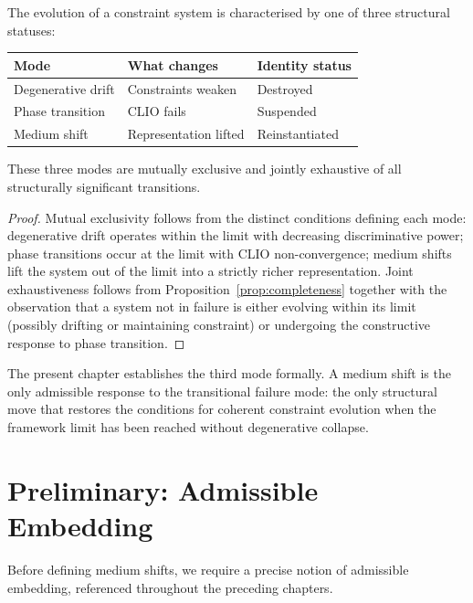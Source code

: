 \documentclass[11pt,openany]{book}
\begin{document}
\begin{proposition}
\label{prop:classification}
The evolution of a constraint system is characterised by
one of three structural statuses:

\medskip
\begin{center}
\begin{tabular}{lll}
\toprule
\textbf{Mode} & \textbf{What changes} & \textbf{Identity status} \\
\midrule
Degenerative drift    & Constraints weaken       & Destroyed       \\
Phase transition      & CLIO fails               & Suspended       \\
Medium shift          & Representation lifted    & Reinstantiated  \\
\bottomrule
\end{tabular}
\end{center}
\medskip

These three modes are mutually exclusive and jointly
exhaustive of all structurally significant transitions.
\end{proposition}

\begin{proof}
Mutual exclusivity follows from the distinct conditions
defining each mode: degenerative drift operates within the
limit with decreasing discriminative power; phase
transitions occur at the limit with CLIO non-convergence;
medium shifts lift the system out of the limit into a
strictly richer representation.  Joint exhaustiveness
follows from Proposition~\ref{prop:completeness} together
with the observation that a system not in failure is either
evolving within its limit (possibly drifting or maintaining
constraint) or undergoing the constructive response to
phase transition.
\end{proof}

The present chapter establishes the third mode formally.
A medium shift is the only admissible response to the
transitional failure mode: the only structural move that
restores the conditions for coherent constraint evolution
when the framework limit has been reached without
degenerative collapse.

\section{Preliminary: Admissible Embedding}
\label{sec:embedding}

Before defining medium shifts, we require a precise notion
of admissible embedding, referenced throughout the
preceding chapters.
\end{document}
